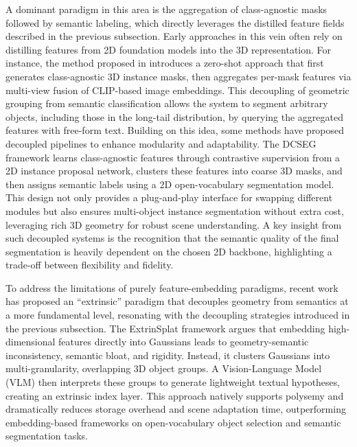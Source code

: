 \documentclass[11pt]{article}
\begin{document}
A dominant paradigm in this area is the aggregation of class-agnostic masks followed by semantic labeling, which directly leverages the distilled feature fields described in the previous subsection. Early approaches in this vein often rely on distilling features from 2D foundation models into the 3D representation. For instance, the method proposed in \cite{ref511} introduces a zero-shot approach that first generates class-agnostic 3D instance masks, then aggregates per-mask features via multi-view fusion of CLIP-based image embeddings. This decoupling of geometric grouping from semantic classification allows the system to segment arbitrary objects, including those in the long-tail distribution, by querying the aggregated features with free-form text. Building on this idea, some methods have proposed decoupled pipelines to enhance modularity and adaptability. The DCSEG framework \cite{ref512} learns class-agnostic features through contrastive supervision from a 2D instance proposal network, clusters these features into coarse 3D masks, and then assigns semantic labels using a 2D open-vocabulary segmentation model. This design not only provides a plug-and-play interface for swapping different modules but also ensures multi-object instance segmentation without extra cost, leveraging rich 3D geometry for robust scene understanding. A key insight from such decoupled systems is the recognition that the semantic quality of the final segmentation is heavily dependent on the chosen 2D backbone, highlighting a trade-off between flexibility and fidelity.

To address the limitations of purely feature-embedding paradigms, recent work has proposed an ``extrinsic'' paradigm that decouples geometry from semantics at a more fundamental level, resonating with the decoupling strategies introduced in the previous subsection. The ExtrinSplat framework \cite{ref505} argues that embedding high-dimensional features directly into Gaussians leads to geometry-semantic inconsistency, semantic bloat, and rigidity. Instead, it clusters Gaussians into multi-granularity, overlapping 3D object groups. A Vision-Language Model (VLM) then interprets these groups to generate lightweight textual hypotheses, creating an extrinsic index layer. This approach natively supports polysemy and dramatically reduces storage overhead and scene adaptation time, outperforming embedding-based frameworks on open-vocabulary object selection and semantic segmentation tasks.
\end{document}
